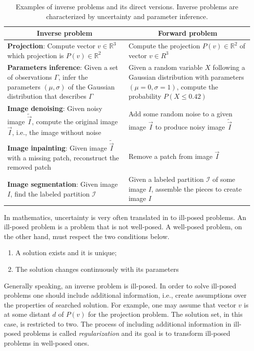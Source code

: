 \begin{table}
\renewcommand{\arraystretch}{1.5}
\footnotesize
\begin{tabular}{|m{7cm}|m{7cm}|}
\hline
\multicolumn{1}{|c|}{\textbf{Inverse problem}} & \multicolumn{1}{c|}{\textbf{Forward problem}} \\
\hline
\textbf{Projection}: Compute vector $v \in \mathbb{R}^3$ which projection is $P(v) \in \mathbb{R}^2$ & Compute the projection $P(v) \in \mathbb{R}^2$ of vector $v \in R^3$\\
\hline
\textbf{Parameters inference}: Given a set of observations $\Gamma$, infer the parameters $(\mu,\sigma)$ of the Gaussian distribution that describes $\Gamma$ & Given a random variable $X$ following a Gaussian distribution with parameters $(\mu=0,\sigma=1)$, compute the probability $P(X \leq 0.42)$\\
\hline
\textbf{Image denoising}: Given noisy image $\widetilde{\vec{I}}$, compute the original image $\vec{I}$, i.e., the image without noise & Add some random noise to a given image $\vec{I}$ to produce noisy image $\widetilde{\vec{I}}$\\
\hline
\textbf{Image inpainting}: Given image $\widetilde{\vec{I}}$ with a missing patch, reconstruct the removed patch & Remove a patch from image $\vec{I}$ \\
\hline
\textbf{Image segmentation}: Given image $I$, find the labeled partition $\mathcal{I}$ & Given a labeled partition $\mathcal{I}$ of some image $I$, assemble the pieces to create image $I$\\
\hline
\end{tabular}
\caption{Examples of inverse problems and its direct versions. Inverse problems are characterized by uncertainty and parameter inference. }
\label{ch1:tab:inverse-problems-list}
\end{table}

In mathematics, uncertainty is very often translated in to ill-posed problems. An ill-posed problem is a problem that is not well-posed. A well-posed problem, on the other hand, must respect the two conditions below.

\begin{enumerate}
\item{A solution exists and it is unique;}
\item{The solution changes continuously with its parameters}
\end{enumerate}



Generally speaking, an inverse problem is ill-posed. In order to solve ill-posed problems one should include additional information, i.e., create assumptions over the properties of searched solution. For example, one may assume that vector $v$ is at some distant $d$ of $P(v)$ for the projection problem. The solution set, in this case, is restricted to two. The process of including additional information in ill-posed problems is called \emph{regularization} and its goal is to transform ill-posed problems in well-posed ones. 

